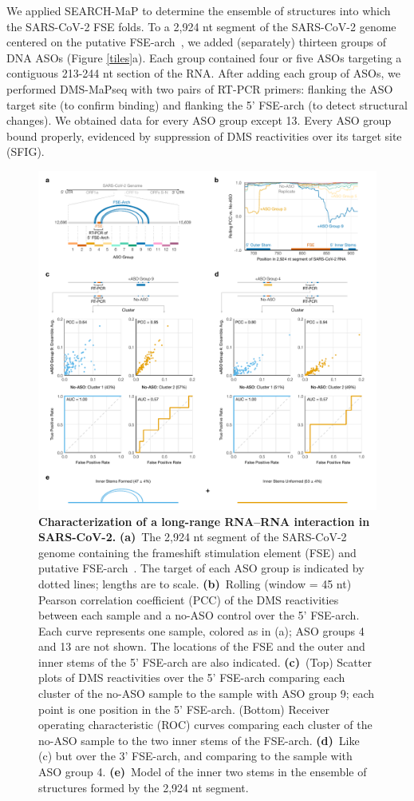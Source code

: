 \documentclass[main.tex]{subfiles}
\begin{document}
We applied SEARCH-MaP to determine the ensemble of structures into which the SARS-CoV-2 FSE folds.
To a 2,924 nt segment of the SARS-CoV-2 genome centered on the putative FSE-arch~\cite{Ziv2020}, we added (separately) thirteen groups of DNA ASOs (Figure \ref{tiles}a).
Each group contained four or five ASOs targeting a contiguous 213-244 nt section of the RNA.
After adding each group of ASOs, we performed DMS-MaPseq with two pairs of RT-PCR primers: flanking the ASO target site (to confirm binding) and flanking the 5' FSE-arch (to detect structural changes).
We obtained data for every ASO group except 13.
Every ASO group bound properly, evidenced by suppression of DMS reactivities over its target site (SFIG).

\begin{figure}[H]
	\includegraphics[width=\textwidth]{../MainFigures/sars2-tile/sars2-tile.pdf}
	\caption{\textbf{Characterization of a long-range RNA--RNA interaction in SARS-CoV-2.} \textbf{(a)}~The 2,924 nt segment of the SARS-CoV-2 genome containing the frameshift stimulation element (FSE) and putative FSE-arch~\cite{Ziv2020}. The target of each ASO group is indicated by dotted lines; lengths are to scale. \textbf{(b)}~Rolling (window = 45 nt) Pearson correlation coefficient (PCC) of the DMS reactivities between each sample and a no-ASO control over the 5' FSE-arch. Each curve represents one sample, colored as in (a); ASO groups 4 and 13 are not shown. The locations of the FSE and the outer and inner stems of the 5' FSE-arch are also indicated. \textbf{(c)}~(Top) Scatter plots of DMS reactivities over the 5' FSE-arch comparing each cluster of the no-ASO sample to the sample with ASO group 9; each point is one position in the 5' FSE-arch. (Bottom) Receiver operating characteristic (ROC) curves comparing each cluster of the no-ASO sample to the two inner stems of the FSE-arch. \textbf{(d)}~Like (c) but over the 3' FSE-arch, and comparing to the sample with ASO group 4. \textbf{(e)}~Model of the inner two stems in the ensemble of structures formed by the 2,924 nt segment.}

\end{figure}
\end{document}
